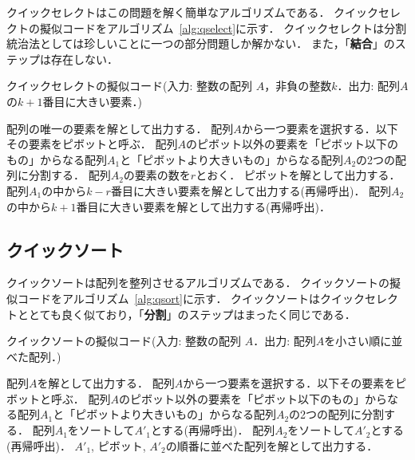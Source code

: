 \documentclass[a4paper,twoside,onecolumn,openany,article]{memoir}
\theoremstyle{remark}
\begin{document}
\vspace{1em}
\noindent
クイックセレクトはこの問題を解く簡単なアルゴリズムである．
クイックセレクトの擬似コードをアルゴリズム~\ref{alg:qselect}に示す．
クイックセレクトは分割統治法としては珍しいことに一つの部分問題しか解かない．
また，「\textbf{結合}」のステップは存在しない．

\begin{algorithm}
\caption{クイックセレクトの擬似コード(入力: 整数の配列 $A$，非負の整数$k$．出力: 配列$A$の$k+1$番目に大きい要素．)}
\label{alg:qselect}
\begin{algorithmic}
  \State 配列の唯一の要素を解として出力する．
\Else
  \State 配列$A$から一つ要素を選択する．以下その要素をピボットと呼ぶ．
  \State 配列$A$のピボット以外の要素を「ピボット以下のもの」からなる配列$A_1$と「ピボットより大きいもの」からなる配列$A_2$の2つの配列に分割する．
  \State 配列$A_2$の要素の数を$r$とおく．
    \State ピボットを解として出力する．
    \State 配列$A_1$の中から$k-r$番目に大きい要素を解として出力する(再帰呼出)．
  \Else
    \State 配列$A_2$の中から$k+1$番目に大きい要素を解として出力する(再帰呼出)．
  \EndIf
\EndIf
\end{algorithmic}
\end{algorithm}


\subsection{クイックソート}
クイックソートは配列を整列させるアルゴリズムである．
クイックソートの擬似コードをアルゴリズム~\ref{alg:qsort}に示す．
クイックソートはクイックセレクトととても良く似ており，「\textbf{分割}」のステップはまったく同じである．

\begin{algorithm}
\caption{クイックソートの擬似コード(入力: 整数の配列 $A$．出力: 配列$A$を小さい順に並べた配列．)}
\label{alg:qsort}
\begin{algorithmic}
  \State 配列$A$を解として出力する．
\Else
  \State 配列$A$から一つ要素を選択する．以下その要素をピボットと呼ぶ．
  \State 配列$A$のピボット以外の要素を「ピボット以下のもの」からなる配列$A_1$と「ピボットより大きいもの」からなる配列$A_2$の2つの配列に分割する．
  \State 配列$A_1$をソートして$A'_1$とする(再帰呼出)．
  \State 配列$A_2$をソートして$A'_2$とする(再帰呼出)．
  \State $A'_1$, ピボット, $A'_2$の順番に並べた配列を解として出力する．
\EndIf
\end{algorithmic}
\end{algorithm}
\end{document}
